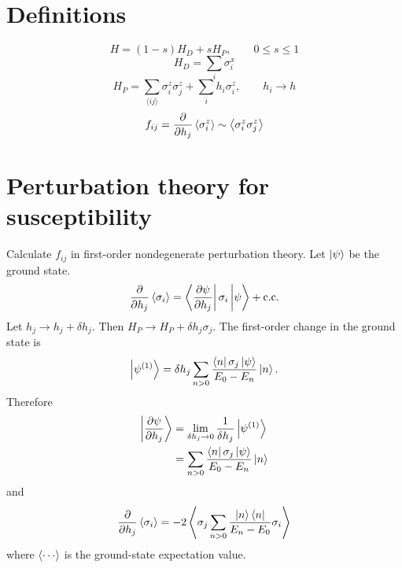 %


\newcommand{\nnsum}[2]{\sum_{\langle #1 #2 \rangle}}
\newcommand{\cc}{\mathrm{c.c.}}
\newcommand{\nghbr}[2]{#1,\,#2}



\section{Definitions}

\begin{equation}
  H = (1 - s) H_D + s H_P,
  \qquad
  0 \leq s \leq 1
  \label{def-h_qaa}
\end{equation}
\begin{equation}
  H_D = \sum_i \sigma^x_i
  \label{def-h_d}
\end{equation}
\begin{equation}
  H_P = \nnsum{i}{j} \sigma^z_i \sigma^z_j + \sum_i h_i \sigma^z_i,
  \qquad
  h_i \rightarrow h
  \label{def-h_p}
\end{equation}
\begin{equation}
  f_{ij} = \frac{\partial }{\partial h_j} \left< \sigma^z_i \right>
  \sim \left< \sigma^z_i \sigma^z_j \right>
  \label{def-f}
\end{equation}

\section{Perturbation theory for susceptibility}

Calculate $f_{ij}$ in first-order nondegenerate perturbation theory.
Let $\left| \psi \right>$ be the ground state.
\begin{equation}
  \pd{}{h_j} \avg{\sigma_i}
  = \matrixel{\pd{\psi}{h_j}}{\sigma_i}{\psi} + \cc
  \label{}
\end{equation}
Let
$h_j \rightarrow h_j + \delta h_j$.
Then
$H_P \rightarrow H_P + \delta h_j \sigma_j$.
The first-order change in the ground state is
\begin{equation}
  \ket{\psi^{(1)}}
  = \delta h_j \sum_{n>0} \frac{\matrixel{n}{\sigma_j}{\psi}}{E_0 - E_n} \ket{n}.
  \label{}
\end{equation}
Therefore
\begin{align}
  \ket{\pd{\psi}{h_j}}
  &= \lim_{\delta h_j \rightarrow 0} \frac{1}{\delta h_j} \ket{\psi^{(1)}} \\
  &= \sum_{n>0} \frac{\matrixel{n}{\sigma_j}{\psi}}{E_0 - E_n} \ket{n}
  \label{}
\end{align}
and
\begin{equation}
  \frac{\partial }{\partial h_j} \left< \sigma_i \right>
  = -2 \left< \sigma_j \sum_{n>0} \frac{\left| n \right> \left< n \right|}{E_n - E_0} \sigma_i \right>
  \label{}
\end{equation}
where $\avg{\cdots}$ is the ground-state expectation value.

